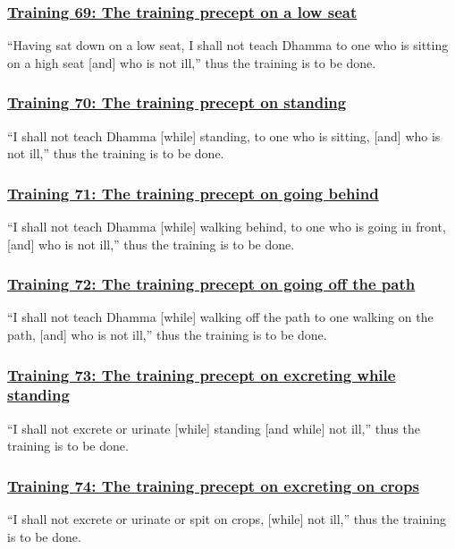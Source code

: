 \subsubsection*{\hyperref[sekh69]{Training 69: The training precept on a low seat}}
\label{training69}
``Having sat down on a low seat, I shall not teach Dhamma to one who is sitting on a high seat [and] who is not ill,'' thus the training is to be done.

\subsubsection*{\hyperref[sekh70]{Training 70: The training precept on standing}}
\label{training70}
``I shall not teach Dhamma [while] standing, to one who is sitting, [and] who is not ill,'' thus the training is to be done.

\subsubsection*{\hyperref[sekh71]{Training 71: The training precept on going behind}}
\label{training71}
``I shall not teach Dhamma [while] walking behind, to one who is going in front, [and] who is not ill,'' thus the training is to be done.

\subsubsection*{\hyperref[sekh72]{Training 72: The training precept on going off the path}}
\label{training72}
``I shall not teach Dhamma [while] walking off the path to one walking on the path, [and] who is not ill,'' thus the training is to be done.

\subsubsection*{\hyperref[sekh73]{Training 73: The training precept on excreting while standing}}
\label{training73}
``I shall not excrete or urinate [while] standing [and while] not ill,'' thus the training is to be done.

\subsubsection*{\hyperref[sekh74]{Training 74: The training precept on excreting on crops}}
\label{training74}
``I shall not excrete or urinate or spit on crops, [while] not ill,'' thus the training is to be done.

